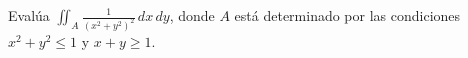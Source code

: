 Evalúa \(\displaystyle\iint_A \frac{1}{\left(x^2 + y^2\right)^2} \, dx \, dy\), donde \( A \) está determinado por las condiciones \( x^2 + y^2 \leq 1 \) y \( x + y \geq 1 \).
